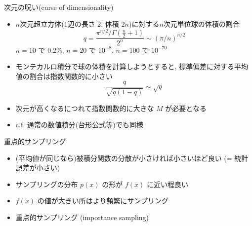 \begin{frame}[t,fragile]{次元の呪い(curse of dimensionality)}
  \begin{itemize}
  \item $n$次元超立方体(1辺の長さ 2, 体積 $2n$)に対する$n$次元単位球の体積の割合
    \[
    q = \frac{\pi^{n/2} / \Gamma(\frac{n}{2}+1)}{2^n} \sim (\pi/n)^{n/2}
    \]
    $n=10$ で 0.2\%, $n=20$ で $10^{-8}$, $n=100$ で $10^{-70}$
  \item モンテカルロ積分で球の体積を計算しようとすると, 標準偏差に対する平均値の割合は指数関数的に小さい
    \[
    \frac{q}{\sqrt{q(1-q)}} \sim \sqrt{q}
    \]
  \item 次元が高くなるにつれて指数関数的に大きな $M$ が必要となる
  \item c.f. 通常の数値積分(台形公式等)でも同様
  \end{itemize}
\end{frame}

\begin{frame}[t,fragile]{重点的サンプリング}
  \begin{itemize}
    \setlength{\itemsep}{1em}
  \item (平均値が同じなら)被積分関数の分散が小さければ小さいほど良い (= 統計誤差が小さい)
  \item サンプリングの分布 $p(x)$ の形が $f(x)$ に近い程良い
  \item $f(x)$ の値が大きい所はより頻繁にサンプリング
  \item 重点的サンプリング (importance sampling)
  \end{itemize}
\end{frame}

